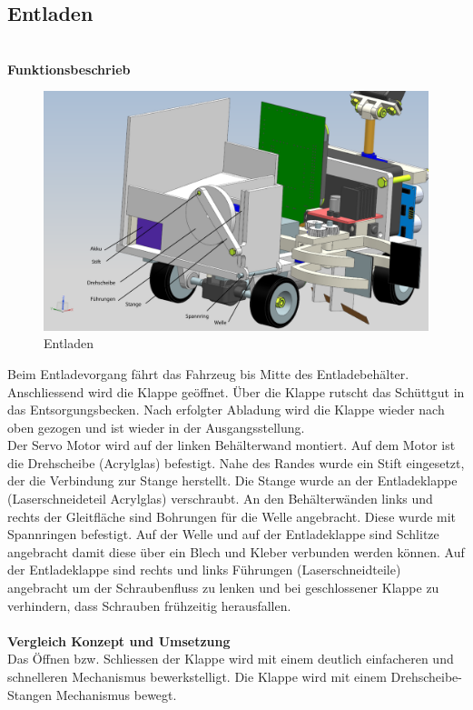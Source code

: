 \subsection{Entladen}
\\
\textbf{Funktionsbeschrieb}
\begin{figure}[H]
\centering
\includegraphics[width=1\textwidth]{03_Loesungskonzept/pictures/entladen12.png}
\caption{Entladen}
\end{figure}
Beim Entladevorgang fährt das Fahrzeug bis Mitte des Entladebehälter. Anschliessend wird die Klappe geöffnet. Über die Klappe rutscht das Schüttgut in das Entsorgungsbecken. Nach erfolgter Abladung wird die Klappe wieder nach oben gezogen und ist wieder in der Ausgangsstellung.\\[0.2cm]
Der Servo Motor wird auf der linken Behälterwand montiert. Auf dem Motor ist die Drehscheibe (Acrylglas) befestigt. Nahe des Randes wurde ein Stift eingesetzt, der die Verbindung zur Stange herstellt. Die Stange wurde an der Entladeklappe (Laserschneideteil Acrylglas) verschraubt.
An den Behälterwänden links und rechts der Gleitfläche sind Bohrungen für die Welle angebracht. Diese wurde mit Spannringen befestigt. Auf der Welle und auf der Entladeklappe sind Schlitze angebracht damit diese über ein Blech und Kleber verbunden werden können.
Auf der Entladeklappe sind rechts und links Führungen (Laserschneidteile) angebracht um der Schraubenfluss zu lenken und bei geschlossener Klappe zu verhindern, dass Schrauben frühzeitig herausfallen.\\[0.2cm]
\\
\textbf{Vergleich Konzept und Umsetzung}\\[0.2cm]
Das Öffnen bzw. Schliessen der Klappe wird mit einem deutlich einfacheren und schnelleren Mechanismus bewerkstelligt. Die Klappe wird mit einem Drehscheibe-Stangen Mechanismus bewegt.\\[0.2cm]